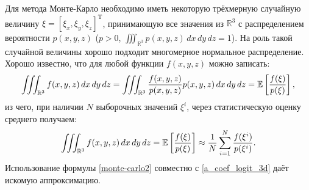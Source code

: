 Для метода Монте-Карло необходимо иметь некоторую трёхмерную случайную величину $\xi = {[\xi_x, \xi_y, \xi_z]}^\mathrm{T}$, принимающую все значения из $\mathbb{R}^3$ с распределением вероятности $p(x, y, z)$ ($p > 0$, $\iiint_{\mathbb{R}^3}p(x, y, z)\, dx\, dy\, dz = 1$). На роль такой случайной величины хорошо подходит многомерное нормальное распределение. Хорошо известно, что для любой функции $f(x, y, z)$ можно записать:
\begin{equation}
	\iiint_{\mathbb{R}^3}f(x,y,z)\, dx\, dy\, dz=\iiint_{\mathbb{R}^3}\frac{f(x,y,z)}{p(x,y,z)}p(x,y,z)\, dx\, dy\, dz=\mathbb{E}\left[\frac{f(\xi)}{p(\xi)}\right],
	\label{monte-carlo1}
\end{equation}
из чего, при наличии $N$ выборочных значений $\xi^i$, через статистическую оценку среднего получаем:
\begin{equation}
	\iiint_{\mathbb{R}^3}f(x,y,z)\, dx\, dy\, dz=\mathbb{E}\left[\frac{f(\xi)}{p(\xi)}\right] \approx \frac{1}{N}\sum_{i=1}^N\frac{f(\xi^i)}{p(\xi^i)}.
	\label{monte-carlo2}
\end{equation}
Использование формулы \ref{monte-carlo2} совместно с \ref{a_coef_logit_3d} даёт искомую аппроксимацию.

